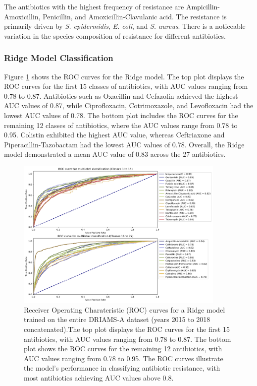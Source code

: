 \documentclass[english,11pt,a4paper,titlepage]{article}
\begin{document}
The antibiotics with the highest frequency of resistance are Ampicillin-Amoxicillin, Penicillin, and Amoxicillin-Clavulanic acid. The resistance is primarily driven by \textit{S. epidermidis}, \textit{E. coli}, and \textit{S. aureus}. There is a noticeable variation in the species composition of resistance for different antibiotics.

\subsubsection*{Ridge Model Classification}
Figure \ref{fig:ROC_ridge} shows the ROC curves for the Ridge model. The top plot displays the ROC curves for the first 15 classes of antibiotics, with AUC values ranging from 0.78 to 0.87. Antibiotics such as Oxacillin and Cefazolin achieved the highest AUC values of 0.87, while Ciprofloxacin, Cotrimoxazole, and Levofloxacin had the lowest AUC values of 0.78. The bottom plot includes the ROC curves for the remaining 12 classes of antibiotics, where the AUC values range from 0.78 to 0.95. Colistin exhibited the highest AUC value, whereas Ceftriaxone and Piperacillin-Tazobactam had the lowest AUC values of 0.78. Overall, the Ridge model demonstrated a mean AUC value of 0.83 across the 27 antibiotics.

\begin{figure}[h]
	\centering
	\includegraphics[width=0.9\textwidth]{img/ROC_curves_ridge.png}
	\caption{Receiver Operating Charateristic (ROC) curves for a Ridge model trained on the entire DRIAMS-A dataset (years 2015 to 2018 concatenated).The top plot displays the ROC curves for the first 15 antibiotics, with AUC values ranging from 0.78 to 0.87. The bottom plot shows the ROC curves for the remaining 12 antibiotics, with AUC values ranging from 0.78 to 0.95. The ROC curves illustrate the model's performance in classifying antibiotic resistance, with most antibiotics achieving AUC values above 0.8.}
	\label{fig:ROC_ridge}
\end{figure}
\end{document}
